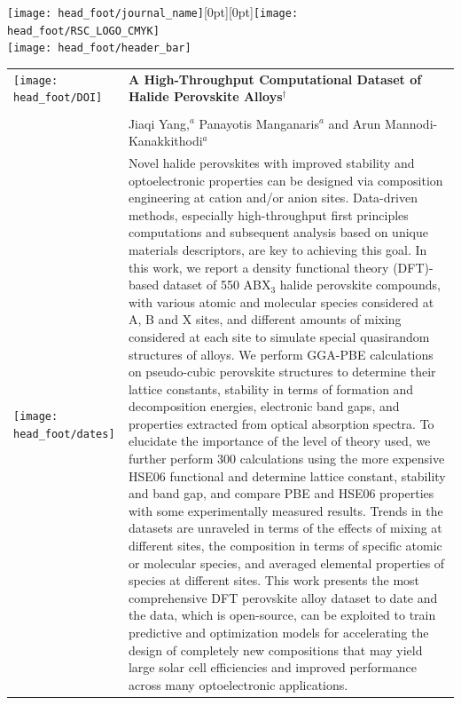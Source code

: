 \documentclass[twoside,twocolumn,9pt]{article}
\begin{document}
  \begin{@twocolumnfalse}
{\texttt{[image: head\_foot/journal\_name]}\hfill\raisebox{0pt}[0pt][0pt]{\texttt{[image: head\_foot/RSC\_LOGO\_CMYK]}}\\[1ex]
\texttt{[image: head\_foot/header\_bar]}}\par
\vspace{1em}
\sffamily
\begin{tabular}{m{4.5cm} p{13.5cm} }

\texttt{[image: head\_foot/DOI]} & \noindent\LARGE{\textbf{A High-Throughput Computational Dataset of Halide Perovskite Alloys$^\dag$}} \\%
\vspace{0.3cm} & \vspace{0.3cm} \\

 & \noindent\large{Jiaqi Yang,\textit{$^{a}$} Panayotis Manganaris\textit{$^{a}$} and Arun Mannodi-Kanakkithodi\textit{$^{a}$}} \\%

\texttt{[image: head\_foot/dates]} & \noindent\normalsize{Novel halide perovskites with improved stability and optoelectronic properties can be designed via composition engineering at cation and/or anion sites. Data-driven methods, especially high-throughput first principles computations and subsequent analysis based on unique materials descriptors, are key to achieving this goal. In this work, we report a density functional theory (DFT)-based dataset of 550 ABX$_3$ halide perovskite compounds, with various atomic and molecular species considered at A, B and X sites, and different amounts of mixing considered at each site to simulate special quasirandom structures of alloys. We perform GGA-PBE calculations on pseudo-cubic perovskite structures to determine their lattice constants, stability in terms of formation and decomposition energies, electronic band gaps, and properties extracted from optical absorption spectra. To elucidate the importance of the level of theory used, we further perform 300 calculations using the more expensive HSE06 functional and determine lattice constant, stability and band gap, and compare PBE and HSE06 properties with some experimentally measured results. Trends in the datasets are unraveled in terms of the effects of mixing at different sites, the composition in terms of specific atomic or molecular species, and averaged elemental properties of species at different sites. This work presents the most comprehensive DFT perovskite alloy dataset to date and the data, which is open-source, can be exploited to train predictive and optimization models for accelerating the design of completely new compositions that may yield large solar cell efficiencies and improved performance across many optoelectronic applications.} 

\end{tabular}

 \end{@twocolumnfalse} \vspace{0.6cm}
\end{document}
